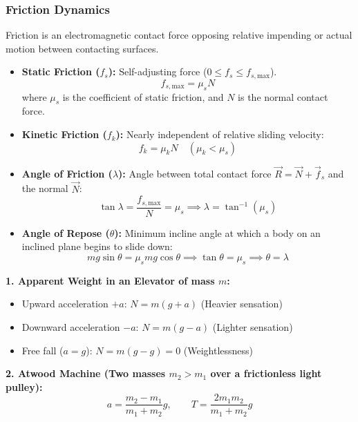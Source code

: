 \documentclass[11pt,a4paper]{article}
\begin{document}
\subsubsection{Friction Dynamics}
Friction is an electromagnetic contact force opposing relative impending or actual motion between contacting surfaces.
\begin{itemize}[leftmargin=1.5em, itemsep=2pt]
  \item \textbf{Static Friction ($f_s$):} Self-adjusting force ($0 \le f_s \le f_{s,\text{max}}$).
  \[
    f_{s,\text{max}} = \mu_s N
  \]
  where $\mu_s$ is the coefficient of static friction, and $N$ is the normal contact force.
  \item \textbf{Kinetic Friction ($f_k$):} Nearly independent of relative sliding velocity:
  \[
    f_k = \mu_k N \quad (\mu_k < \mu_s)
  \]
  \item \textbf{Angle of Friction ($\lambda$):} Angle between total contact force $\vec{R} = \vec{N} + \vec{f}_s$ and the normal $\vec{N}$:
  \[
    \tan \lambda = \frac{f_{s,\text{max}}}{N} = \mu_s \implies \lambda = \tan^{-1}(\mu_s)
  \]
  \item \textbf{Angle of Repose ($\theta$):} Minimum incline angle at which a body on an inclined plane begins to slide down:
  \[
    mg \sin\theta = \mu_s mg \cos\theta \implies \tan \theta = \mu_s \implies \theta = \lambda
  \]
\end{itemize}

\begin{formulabox}
\textbf{1. Apparent Weight in an Elevator of mass $m$:}
\begin{itemize}[leftmargin=1.2em, itemsep=2pt]
  \item Upward acceleration $+a$: $N = m(g + a)$ (Heavier sensation)
  \item Downward acceleration $-a$: $N = m(g - a)$ (Lighter sensation)
  \item Free fall ($a = g$): $N = m(g - g) = 0$ (Weightlessness)
\end{itemize}

\textbf{2. Atwood Machine (Two masses $m_2 > m_1$ over a frictionless light pulley):}
\[
  a = \frac{m_2 - m_1}{m_1 + m_2} g, \qquad T = \frac{2 m_1 m_2}{m_1 + m_2} g
\]
\end{formulabox}
\end{document}
